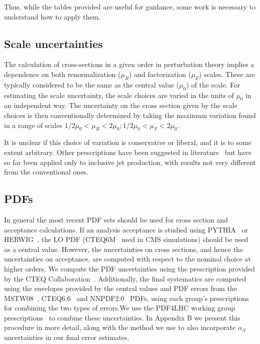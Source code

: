 Thus, while the tables provided are useful for guidance,
some work is necessary to understand how to apply them.


\subsection{Scale uncertainties}
\label{kf}

The calculation of cross-sections in a given order in perturbation theory 
implies a dependence on both renormalization ($\mu_R$) and factorization 
($\mu_F$) scales. These are typically considered to be the same as the central 
value ($\mu_0$) of the scale.  For estimating the scale uncertainty, the scale 
choices are varied in the units of $\mu_0$ in an independent way. 
The uncertainty on the cross section given by the scale choices is
then conventionally determined by taking the maximum variation found in a 
range of scales $1/2 \mu_0 < \mu_R < 2\mu_0; 1/2 \mu_0 < \mu_F < 2\mu_0$. 

It is unclear if this choice of variation is conservative or liberal, and
it is to some extent arbitrary. Other prescriptions have been suggested
in literature~\cite{soper} but have so far been applied only
to inclusive jet production, with results not very different from the 
conventional ones.


\subsection{PDFs}
In general the most recent PDF sets should be used for cross section and 
acceptance calculations. If an analysis acceptance is studied using 
PYTHIA~\cite{Pythia} or HERWIG~\cite{Herwig}, the LO PDF (CTEQ6M~\cite{cteq6m} 
used in CMS simulations) should be used as a central value. However, the 
uncertainties on cross sections, and hence the uncertainties on acceptance, are 
computed with respect to the nominal choice at higher orders. %
We compute the PDF uncertainties using the prescription provided by the CTEQ 
Collaboration~\cite{cteq6m}. Additionally, the final systematics are computed using
the envelopes provided by the central values and PDF errors from the MSTW08~\cite{mstw08}, 
CTEQ6.6~\cite{cteq66} and NNPDF2.0~\cite{nnpdf} PDFs, using each group's prescriptions for 
combining the two types of errors.We use the PDF4LHC working group prescriptions~\cite{pdf4lhc}
to combine these uncertainties. In Appendix B we present this procedure in more detail,
along with the method we use to also incorporate $\alpha_S$ uncertainties in our
final error estimates. 

